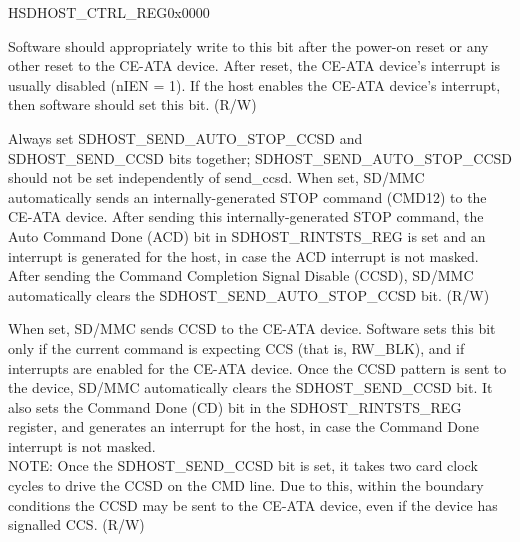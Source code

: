 \begin{register}{H}{SDHOST\_CTRL\_REG}{0x{}0000}\label{regdesc:CTRLREG}
%
%
%
%
%
%
%
%
%
%
%
%
%
%
%
\regnewline%
\begin{regdesc}\begin{reglist}
\item [SDHOST\_CEATA\_DEVICE\_INTERRUPT\_STATUS]Software should appropriately write to this bit after the power-on reset or any other reset to the CE-ATA device. After reset, the CE-ATA device's interrupt is usually disabled (nIEN = 1). If the host enables the CE-ATA device's interrupt, then software should set this bit. (R/W)
\item [SDHOST\_SEND\_AUTO\_STOP\_CCSD]Always set SDHOST\_SEND\_AUTO\_STOP\_CCSD and SDHOST\_SEND\_CCSD bits together; SDHOST\_SEND\_AUTO\_STOP\_CCSD should not be set independently of send\_ccsd. When set, SD/MMC automatically sends an internally-generated STOP command (CMD12) to the CE-ATA device. After sending this internally-generated STOP command, the Auto Command Done (ACD) bit in SDHOST\_RINTSTS\_REG is set and an interrupt is generated for the host, in case the ACD interrupt is not masked. After sending the Command Completion Signal Disable (CCSD), SD/MMC automatically clears the  SDHOST\_SEND\_AUTO\_STOP\_CCSD bit. (R/W)
\item [SDHOST\_SEND\_CCSD]When set, SD/MMC sends CCSD to the CE-ATA device. Software sets this bit only if the current command is expecting CCS (that is, RW\_BLK), and if interrupts are enabled for the CE-ATA device. Once the CCSD pattern is sent to the device, SD/MMC automatically clears the SDHOST\_SEND\_CCSD bit. It also sets the Command Done (CD) bit  in the SDHOST\_RINTSTS\_REG register, and generates an interrupt for the host, in case the Command Done interrupt is not masked.\\
NOTE: Once the SDHOST\_SEND\_CCSD bit is set, it takes two card clock cycles to drive the CCSD on the CMD line. Due to this, within the boundary conditions the CCSD may be sent to the CE-ATA device, even if the device has signalled CCS. (R/W)
\item [Continued on the next page...]
\end{reglist}\end{regdesc}
\end{register}

